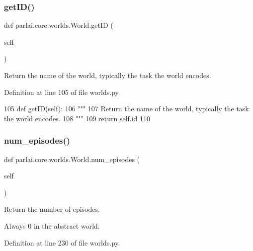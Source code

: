 \subsubsection{\texorpdfstring{get\+I\+D()}{getID()}}
{\footnotesize\ttfamily def parlai.\+core.\+worlds.\+World.\+get\+ID (\begin{DoxyParamCaption}\item[{}]{self }\end{DoxyParamCaption})}

\begin{DoxyVerb}Return the name of the world, typically the task the world encodes.
\end{DoxyVerb}
 

Definition at line 105 of file worlds.\+py.


\begin{DoxyCode}
105     \textcolor{keyword}{def }getID(self):
106         \textcolor{stringliteral}{"""}
107 \textcolor{stringliteral}{        Return the name of the world, typically the task the world encodes.}
108 \textcolor{stringliteral}{        """}
109         \textcolor{keywordflow}{return} self.id
110 
\end{DoxyCode}
\mbox{\label{classparlai_1_1core_1_1worlds_1_1World_a7c7258c4ad6a6bdfc76287832876a25d}} 
\subsubsection{\texorpdfstring{num\+\_\+episodes()}{num\_episodes()}}
{\footnotesize\ttfamily def parlai.\+core.\+worlds.\+World.\+num\+\_\+episodes (\begin{DoxyParamCaption}\item[{}]{self }\end{DoxyParamCaption})}

\begin{DoxyVerb}Return the number of episodes.

Always 0 in the abstract world.
\end{DoxyVerb}
 

Definition at line 230 of file worlds.\+py.


